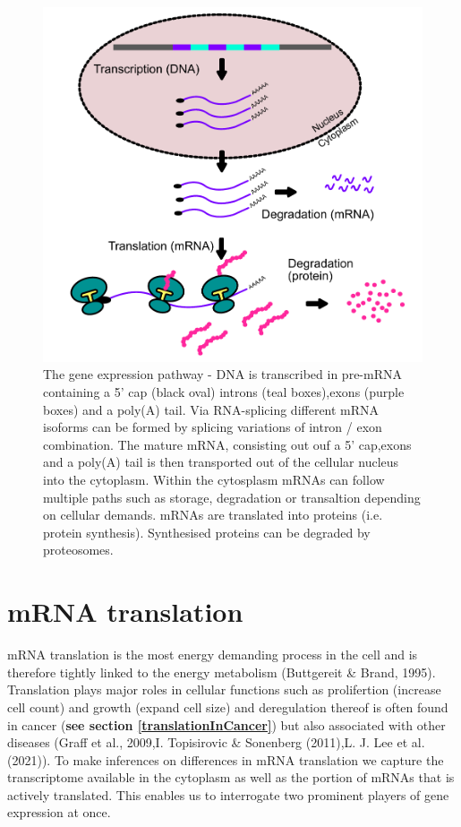 \documentclass[12pt,openany]{book}
\begin{document}
\begin{figure}
  \includegraphics{./figures/geneExprPath_2.pdf}
  \caption{The gene expression pathway - DNA is transcribed in pre-mRNA containing a 5' cap (black oval) introns (teal boxes),exons (purple boxes) and a poly(A) tail. Via RNA-splicing different mRNA isoforms can be formed by splicing variations of intron / exon combination. The mature mRNA, consisting out ouf a 5' cap,exons and a poly(A) tail is then transported out of the cellular nucleus into the cytoplasm. Within the cytosplasm mRNAs can follow multiple paths such as storage, degradation or transaltion depending on cellular demands. mRNAs are translated into proteins (i.e. protein synthesis). Synthesised proteins can be degraded by proteosomes. \label{fig:geneExprPath}}
\end{figure}\section{mRNA translation}

mRNA translation is the most energy demanding process in the cell and is
therefore tightly linked to the energy metabolism (Buttgereit \& Brand,
1995). Translation plays major roles in cellular functions such as
prolifertion (increase cell count) and growth (expand cell size) and
deregulation thereof is often found in cancer (\textbf{see section
\ref{translationInCancer}}) but also associated with other diseases
(Graff et al., 2009,I. Topisirovic \& Sonenberg (2011),L. J. Lee et al.
(2021)). To make inferences on differences in mRNA translation we
capture the transcriptome available in the cytoplasm as well as the
portion of mRNAs that is actively translated. This enables us to
interrogate two prominent players of gene expression at once.
\end{document}
